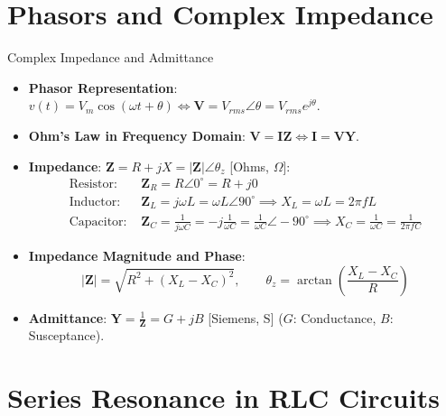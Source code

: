 \section{Phasors and Complex Impedance}

\begin{formulabox}{Complex Impedance and Admittance}
\begin{itemize}[leftmargin=1.5em]
    \item \textbf{Phasor Representation}: $v(t) = V_m \cos(\omega t + \theta) \iff \mathbf{V} = V_{rms}\angle \theta = V_{rms}e^{j\theta}$.
    \item \textbf{Ohm's Law in Frequency Domain}: $\mathbf{V} = \mathbf{I}\mathbf{Z} \iff \mathbf{I} = \mathbf{V}\mathbf{Y}$.
    \item \textbf{Impedance}: $\mathbf{Z} = R + jX = |\mathbf{Z}|\angle \theta_z$ [Ohms, $\Omega$]:
    \begin{align*}
        \text{Resistor: } & \mathbf{Z}_R = R \angle 0^\circ = R + j0 \\
        \text{Inductor: } & \mathbf{Z}_L = j\omega L = \omega L \angle 90^\circ \implies X_L = \omega L = 2\pi f L \\
        \text{Capacitor: } & \mathbf{Z}_C = \frac{1}{j\omega C} = -j\frac{1}{\omega C} = \frac{1}{\omega C} \angle -90^\circ \implies X_C = \frac{1}{\omega C} = \frac{1}{2\pi f C}
    \end{align*}
    \item \textbf{Impedance Magnitude and Phase}:
    \[ |\mathbf{Z}| = \sqrt{R^2 + (X_L - X_C)^2}, \qquad \theta_z = \arctan\left(\frac{X_L - X_C}{R}\right) \]
    \item \textbf{Admittance}: $\mathbf{Y} = \frac{1}{\mathbf{Z}} = G + jB$ [Siemens, S] ($G$: Conductance, $B$: Susceptance).
\end{itemize}
\end{formulabox}

\section{Series Resonance in RLC Circuits}

